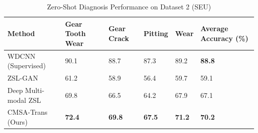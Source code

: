\begin{table}[htbp]
\centering
\caption{Zero-Shot Diagnosis Performance on Dataset 2 (SEU)}
\label{tab:seu_results}
\begin{tabular}{p{3.5cm}p{2cm}p{2cm}p{2cm}p{2cm}p{2.5cm}}
\toprule
\textbf{Method} & \textbf{Gear Tooth Wear} & \textbf{Gear Crack} & \textbf{Pitting} & \textbf{Wear} & \textbf{Average Accuracy (\%)} \\
\midrule
WDCNN (Supervised) & 90.1 & 88.7 & 87.3 & 89.2 & \textbf{88.8} \\
\midrule
ZSL-GAN & 61.2 & 58.9 & 56.4 & 59.7 & 59.1 \\
\midrule
Deep Multi-modal ZSL & 69.8 & 66.5 & 64.2 & 67.9 & 67.1 \\
\midrule
CMSA-Trans (Ours) & \textbf{72.4} & \textbf{69.8} & \textbf{67.5} & \textbf{71.2} & \textbf{70.2} \\
\bottomrule
\end{tabular}
\end{table}